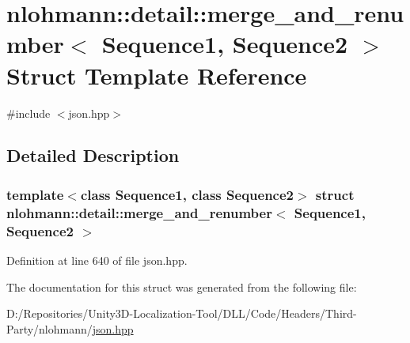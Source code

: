 \hypertarget{structnlohmann_1_1detail_1_1merge__and__renumber}{}\section{nlohmann\+::detail\+::merge\+\_\+and\+\_\+renumber$<$ Sequence1, Sequence2 $>$ Struct Template Reference}
\label{structnlohmann_1_1detail_1_1merge__and__renumber}


{\ttfamily \#include $<$json.\+hpp$>$}



\subsection{Detailed Description}
\subsubsection*{template$<$class Sequence1, class Sequence2$>$\newline
struct nlohmann\+::detail\+::merge\+\_\+and\+\_\+renumber$<$ Sequence1, Sequence2 $>$}



Definition at line 640 of file json.\+hpp.



The documentation for this struct was generated from the following file\+:\begin{DoxyCompactItemize}
\item 
D\+:/\+Repositories/\+Unity3\+D-\/\+Localization-\/\+Tool/\+D\+L\+L/\+Code/\+Headers/\+Third-\/\+Party/nlohmann/\mbox{\hyperlink{json_8hpp}{json.\+hpp}}\end{DoxyCompactItemize}
